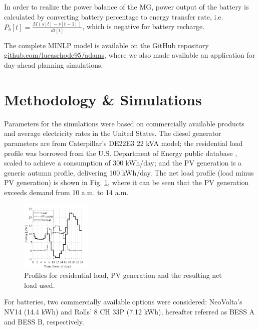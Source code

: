 \documentclass{ieeeaccess}
\begin{document}
    In order to realize the power balance of the MG, power output of the battery is calculated by converting battery percentage to energy transfer rate, i.e. $P_b[t] = \frac{M(s[t]-s[t-1])}{dt[t]}$, which is negative for battery recharge.

    The complete MINLP model is available on the GitHub repository \href{https://github.com/lucasrhode95/adams}{github.com/lucasrhode95/adams}, where we also made available an application for day-ahead planning simulations.

    \section{Methodology \& Simulations}
    Parameters for the simulations were based on commercially available products and average electricity rates in the United States. The diesel generator parameters are from Caterpillar's DE22E3 22 kVA model; the residential load profile was borrowed from the U.S. Department of Energy public database \cite{DOE2013}, scaled to achieve a consumption of 300 kWh/day; and the PV generation is a generic autumn profile, delivering 100 kWh/day. The net load profile (load minus PV generation) is shown in Fig. \ref{fig:net-load}, where it can be seen that the PV generation exceeds demand from 10 a.m. to 14 a.m.
    \begin{figure}[htbp]
        \centering
        \includegraphics[width=0.3\textwidth]{figures/net_load.pdf}
        \caption{Profiles for residential load, PV generation and the resulting net load used.}
        \label{fig:net-load}
    \end{figure}

    For batteries, two commercially available options were considered: NeoVolta's NV14 (14.4 kWh) and Rolls' 8 CH 33P (7.12 kWh), hereafter referred as BESS A and BESS B, respectively.
\end{document}
